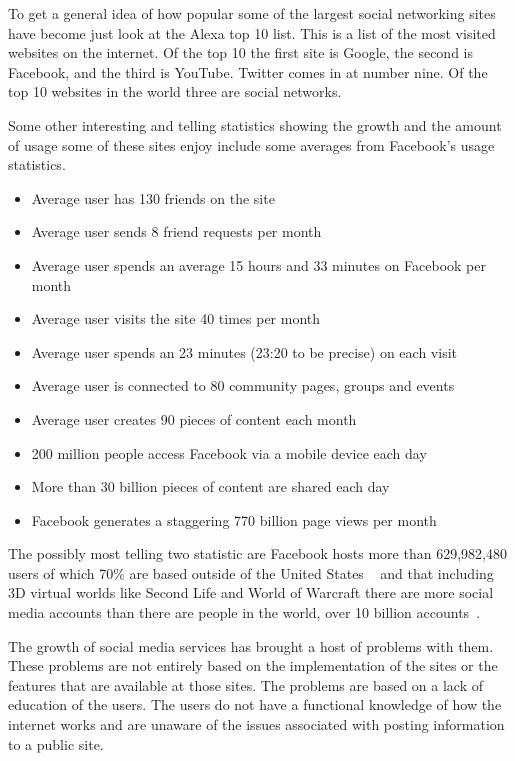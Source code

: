 To get a general idea of how popular some of the largest social networking sites
have become just look at the Alexa top 10 list. This is a list of the most
visited websites on the internet. Of the top 10 the first site is Google, the
second is Facebook, and the third is YouTube. Twitter comes in at number nine.
Of the top 10 websites in the world three are social networks.~\cite{alexa}

Some other interesting and telling statistics showing the growth and the amount
of usage some of these sites enjoy include some averages from Facebook's usage
statistics. 
\begin{itemize}
    \item Average user has 130 friends on the site
    \item Average user sends 8 friend requests per month
    \item Average user spends an average 15 hours and 33 minutes on Facebook per month
    \item Average user visits the site 40 times per month
    \item Average user spends an 23 minutes (23:20 to be precise) on each visit
    \item Average user is connected to 80 community pages, groups and events
    \item Average user creates 90 pieces of content each month
    \item 200 million people access Facebook via a mobile device each day
    \item More than 30 billion pieces of content are shared each day
    \item Facebook generates a staggering 770 billion page views per month
\end{itemize}
The possibly most telling two statistic are Facebook hosts more than
629,982,480 users of which 70\% are based outside of the United
States ~\cite{smt} and that including 3D virtual worlds like Second Life and
World of Warcraft there are more social media accounts than there are people in
the world, over 10 billion accounts~\cite{silicon}.

The growth of social media services has brought a host of problems with them.
These problems are not entirely based on the implementation of the sites or the
features that are available at those sites. The problems are based on a lack of
education of the users. The users do not have a functional knowledge of how
the internet works and are unaware of the issues associated with posting
information to a public site.

